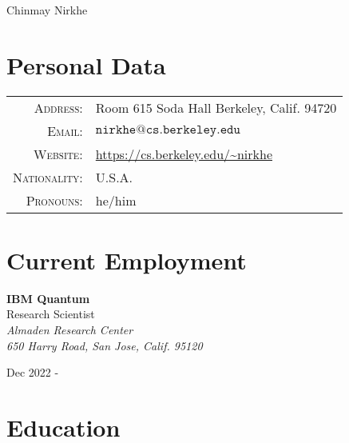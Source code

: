 \documentclass{article}
\begin{document}


\par{
		{\LARGE {Chinmay Nirkhe}
	}\bigskip\par}

\section{Personal Data}

\begin{tabular}{rl}
    \textsc{Address:}     & Room 615 Soda Hall Berkeley, Calif. 94720 \\
    \textsc{Email:}       & $\mathtt{nirkhe@cs.berkeley.edu}$ \\
    \textsc{Website:}     & \url{https://cs.berkeley.edu/~nirkhe} \\
    \textsc{Nationality:} & U.S.A. \\
    \textsc{Pronouns:}    & he/him \\
\end{tabular}

\section{Current Employment}
\textbf{IBM Quantum} \\
Research Scientist \\

\emph{Almaden Research Center \\ 650 Harry Road, San Jose, Calif. 95120}

Dec 2022 -

\section{Education}
\end{document}
